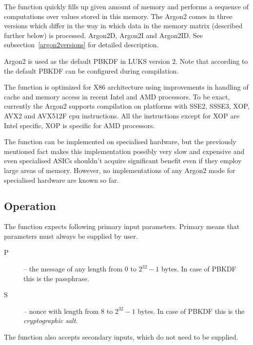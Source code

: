 \documentclass[nolof]{fithesis3}
\begin{document}
The function quickly fills up given amount of memory and performs a sequence of computations over values stored in this memory. The Argon2 comes in three versions which differ in the way in which data in the memory matrix (described further below) is processed. Argon2D, Argon2I and Argon2ID. See subsection~\ref{argon2versions} for detailed description.

Argon2 is used as the default PBKDF in LUKS version 2. Note that according to \parencite{cryptsetupmanual} the default PBKDF can be configured during compilation.

The function is optimized for X86 architecture using improvements in handling of cache and memory access in recent Intel and AMD processors. To be exact, currently the Argon2 supports compilation on platforms with SSE2, SSSE3, XOP, AVX2 and AVX512F cpu instructions. All the instructions except for XOP are Intel specific, XOP is specific for AMD processors.

The function can be implemented on specialised hardware, but the previously mentioned fact makes this implementation possibly very slow and expensive and even specialised ASICs shouldn't acquire significant benefit even if they employ large areas of memory. However, no implementations of any Argon2 mode for specialised hardware are known so far.

\subsection{Operation}
The function expects following primary input parameters. Primary means that parameters must always be supplied by user.

\begin{description}
\item[P] -- the message of any length from 0 to \(2^{32} - 1\) bytes. In case of PBKDF this is the passphrase.

\item[S] -- nonce with length from 8 to \(2^{32} - 1\) bytes. In case of PBKDF this is the \emph{cryptographic salt}.
\end{description}

The function also accepts secondary inputs, which do not need to be supplied.
\end{document}
